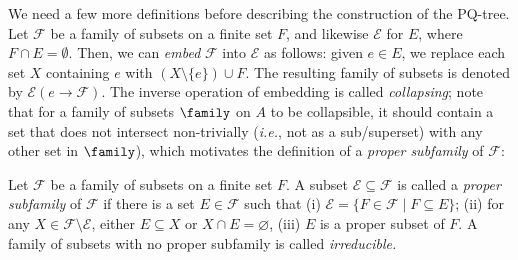 We need a few more definitions before describing the construction of the PQ-tree.
Let $\mathcal{F}$ be a family of subsets on a finite set $F$, and likewise $\mathcal{E}$ for $E$, where $F \cap E = \emptyset$.
Then, we can \emph{embed} $\mathcal{F}$ into $\mathcal{E}$ as follows: given $e \in E$, we replace each set $X$ containing $e$ with $(X \setminus \{e\}) \cup F$. 
The resulting family of subsets is denoted by $\mathcal{E}(e \rightarrow \mathcal{F})$.
The inverse operation of embedding is called \emph{collapsing}; note that for a family of subsets $\family$ on $A$ to be collapsible, it should contain a set that does not intersect non-trivially (\emph{i.e.}, not as a sub/superset) with any other set in $\family$), which motivates the definition of a \emph{proper subfamily} of $\mathcal{F}$:

\begin{definition}\label{def:irreducible}
Let $\mathcal{F}$ be a family of subsets on a finite set $F$. A subset $\mathcal{E} \subseteq \mathcal{F}$ is called a \emph{proper subfamily} of $\mathcal{F}$ if there is a set $E \in \mathcal{F}$ such that (i) $\mathcal{E} = \{F \in \mathcal{F} \mid F \subseteq E\}$; (ii) for any $X \in \mathcal{F} \setminus \mathcal{E}$, either $E \subseteq X$ or $X \cap E = \varnothing$, (iii) $E$ is a proper subset of $F$. 
A family of subsets with no proper subfamily is called \emph{irreducible.}
\end{definition}


